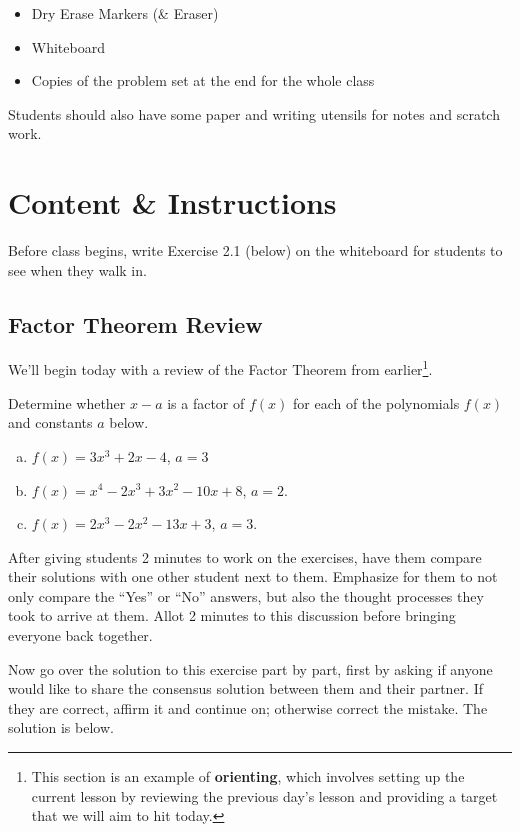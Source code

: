 \begin{itemize}
    \item Dry Erase Markers (\& Eraser)
    \item Whiteboard
    \item Copies of the problem set at the end for the whole class
\end{itemize}

Students should also have some paper and writing utensils for notes and scratch work.


\newpage

\section{Content \& Instructions}

Before class begins, write Exercise 2.1 (below) on the whiteboard for students to see when they walk in.

\subsection{Factor Theorem Review}

We'll begin today with a review of the Factor Theorem from earlier\footnote{This section is an example of \textbf{orienting}, which involves setting up the current lesson by reviewing the previous day's lesson and providing a target that we will aim to hit today.}.

\begin{exercise}
    \label{exc:21}
    Determine whether $x-a$ is a factor of $f(x)$ for each of the polynomials $f(x)$ and constants $a$ below.
    \begin{enumerate}[(a)]
        \item $f(x) = 3x^3 + 2x-4$, $a = 3$
        \item $f(x) = x^4-2x^3+3x^2-10x+8$, $a = 2$.
        \item $f(x) = 2x^3 - 2x^2 - 13x + 3$, $a = 3$.
    \end{enumerate}
\end{exercise}

After giving students 2 minutes to work on the exercises, have them compare their solutions with one other student next to them. Emphasize for them to not only compare the ``Yes'' or ``No'' answers, but also the thought processes they took to arrive at them. Allot 2 minutes to this discussion before bringing everyone back together.

Now go over the solution to this exercise part by part, first by asking if anyone would like to share the consensus solution between them and their partner. If they are correct, affirm it and continue on; otherwise correct the mistake. The solution is below.

